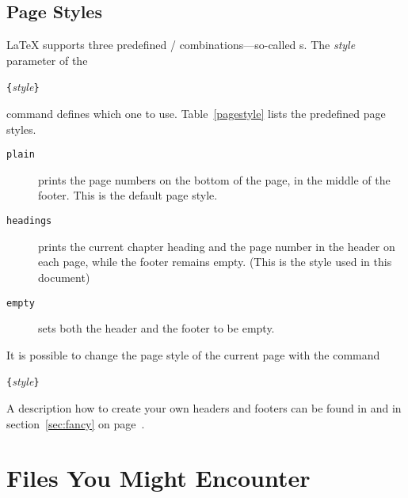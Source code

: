 \subsection{Page Styles}
 
\LaTeX{} supports three predefined /
combinations---so-called s. The \emph{style} parameter
of the 
\begin{lscommand}
\verb|{|\emph{style}\verb|}|
\end{lscommand}
\noindent command defines which one to use. 
Table~\ref{pagestyle}
lists the predefined page styles.

\begin{table}[!hbp]
\caption{The Predefined Page Styles of \LaTeX.} \label{pagestyle}
\begin{lined}{\textwidth}
\begin{description}

\item[\normalfont\texttt{plain}] prints the page numbers on the bottom
  of the page, in the middle of the footer. This is the default page
  style.

\item[\normalfont\texttt{headings}] prints the current chapter heading
  and the page number in the header on each page, while the footer
  remains empty.  (This is the style used in this document)
\item[\normalfont\texttt{empty}] sets both the header and the footer
  to be empty.

\end{description}
\end{lined}
\end{table}

It is possible to change the page style of the current page
with the command
\begin{lscommand}
\verb|{|\emph{style}\verb|}|
\end{lscommand}
A description how to create your own
headers and footers can be found in \companion{} and in section~\ref{sec:fancy} on page~\pageref{sec:fancy}.
%
%

\section{Files You Might Encounter}

